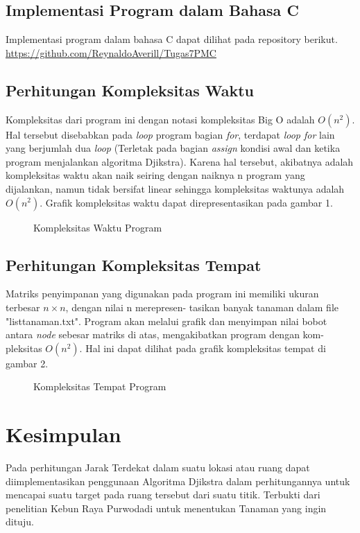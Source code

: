 \documentclass[conference]{IEEEtran}
\begin{document}
\subsection{Implementasi Program dalam Bahasa C}
Implementasi program dalam bahasa C dapat dilihat pada repository berikut. 
\url{https://github.com/ReynaldoAverill/Tugas7PMC}

\subsection{Perhitungan Kompleksitas Waktu}
Kompleksitas dari program ini dengan notasi kompleksitas Big O adalah $O(n^2)$. Hal tersebut disebabkan pada \textit{loop} program bagian \textit{for}, terdapat \textit{loop for} lain yang berjumlah dua \textit{loop} (Terletak pada bagian \textit{assign} kondisi awal dan ketika program menjalankan algoritma Djikstra). Karena hal tersebut, akibatnya adalah kompleksitas waktu akan naik seiring dengan naiknya n program yang dijalankan, namun tidak bersifat linear sehingga kompleksitas waktunya adalah $O(n^2)$. Grafik kompleksitas waktu dapat direpresentasikan pada gambar 1.

\begin{figure}[htbp]
    \centering
    \scalebox{0.38}{}
    \caption{Kompleksitas Waktu Program}
\end{figure}

\subsection{Perhitungan Kompleksitas Tempat}
Matriks penyimpanan yang digunakan pada program ini
memiliki ukuran terbesar $n \times n$, dengan nilai n merepresen-
tasikan banyak tanaman dalam file "listtanaman.txt". Program
akan melalui grafik dan menyimpan nilai bobot antara \textit{node}
sebesar matriks di atas, mengakibatkan program dengan kom-
pleksitas $O(n^2)$. Hal ini dapat dilihat pada grafik kompleksitas
tempat di gambar 2.

\begin{figure}[htbp]
    \centering
    \scalebox{0.38}{}
    \caption{Kompleksitas Tempat Program}
\end{figure}

\section{Kesimpulan}
Pada perhitungan Jarak Terdekat dalam suatu lokasi atau ruang dapat diimplementasikan penggunaan Algoritma Djikstra dalam perhitungannya untuk mencapai suatu target pada ruang tersebut dari suatu titik. Terbukti dari penelitian Kebun Raya Purwodadi untuk menentukan Tanaman yang ingin dituju.



\end{document}

